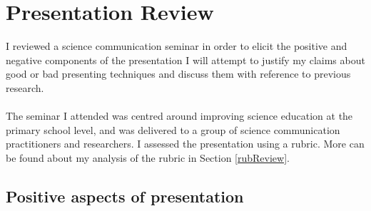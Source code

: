 \section{Presentation Review} \label{semRev}

I reviewed a science communication seminar in order to elicit the positive and negative components of
the presentation
I will attempt to justify my claims about good or bad presenting techniques and
discuss them with reference to previous research.\\
\\
The seminar I attended was centred around improving science education at the primary school level,
and was delivered to a group of science communication practitioners and researchers.
I assessed the presentation using a rubric.
More can be found about my analysis of the rubric in Section \ref{rubReview}.

\subsection{Positive aspects of presentation} \label{semRevPlus}

